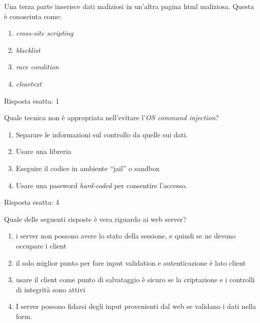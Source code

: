 \begin{Exercise} [
  title={Quiz},
  label={esControlli2}
  ]

  \Question Una terza parte inserisce dati maliziosi in un'altra pagina html
maliziosa. Questa è conosciuta come:
\begin{enumerate}
\item \textit{cross-site scripting}
\item \textit{blacklist}
\item \textit{race condition}
\item \textit{cleartext}
\end{enumerate}

\end{Exercise}

\begin{Answer} [
  ref={esControlli2},
  number={2}
  ]

  \Question Risposta esatta: 1
\end{Answer}

\begin{Exercise} [
  title={Quiz},
  label={esControlli3}
  ]

  \Question Quale tecnica non è appropriata nell'evitare
  l'\textit{OS command injection}?
\begin{enumerate}
\item Separare le informazioni sul controllo da quelle sui dati.
\item Usare una libreria
\item Eseguire il codice in ambiente ``jail'' o sandbox
\item Usare una password \textit{hard-coded} per consentire l'accesso.
\end{enumerate}


\end{Exercise}

\begin{Answer} [
  ref={esControlli3},
  number={3}
  ]

  \Question Risposta esatta: 4
\end{Answer}


\begin{Exercise} [
  title={Quiz},
  label={esControlli4}
  ]

  \Question Quale delle seguenti risposte è vera riguardo ai web server?
  \begin{enumerate}
   \item i server non possono avere lo stato della sessione, e quindi se ne
devono occupare i client
   \item il solo miglior punto per fare input validation e autenticazione è
lato client
   \item usare il client come punto di salvataggio è sicuro se la criptazione
e i controlli di integrità sono attivi
   \item I server possono fidarsi degli input provenienti dal web se validano i
dati nella form.
  \end{enumerate}
\end{Exercise}


